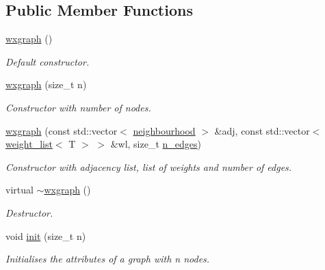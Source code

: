 \subsection*{Public Member Functions}
\begin{DoxyCompactItemize}
\item 
\mbox{\label{classlgraph_1_1wxgraph_ac5cda7ed506eeede338eddf6ef51e4bd}} 
\hyperlink{classlgraph_1_1wxgraph_ac5cda7ed506eeede338eddf6ef51e4bd}{wxgraph} ()
\begin{DoxyCompactList}\small\item\em Default constructor. \end{DoxyCompactList}\item 
\mbox{\label{classlgraph_1_1wxgraph_a84b632e0a65c1cba7e5e91afc576c91e}} 
\hyperlink{classlgraph_1_1wxgraph_a84b632e0a65c1cba7e5e91afc576c91e}{wxgraph} (size\+\_\+t n)
\begin{DoxyCompactList}\small\item\em Constructor with number of nodes. \end{DoxyCompactList}\item 
\hyperlink{classlgraph_1_1wxgraph_a6b99dfb7f13c6a8f223b74fecd0ea4a5}{wxgraph} (const std\+::vector$<$ \hyperlink{namespacelgraph_a052e7766c13f3a43cec0aec8173fdede}{neighbourhood} $>$ \&adj, const std\+::vector$<$ \hyperlink{namespacelgraph_a1e0fd5ef0a78b2a92da48adbed265cb6}{weight\+\_\+list}$<$ T $>$ $>$ \&wl, size\+\_\+t \hyperlink{classlgraph_1_1xxgraph_af00bce8b07a42754601d1e3bebe2c1fa}{n\+\_\+edges})
\begin{DoxyCompactList}\small\item\em Constructor with adjacency list, list of weights and number of edges. \end{DoxyCompactList}\item 
\mbox{\label{classlgraph_1_1wxgraph_ab36035f4ca3a467ad239457eea053128}} 
virtual \hyperlink{classlgraph_1_1wxgraph_ab36035f4ca3a467ad239457eea053128}{$\sim$wxgraph} ()
\begin{DoxyCompactList}\small\item\em Destructor. \end{DoxyCompactList}\item 
void \hyperlink{classlgraph_1_1wxgraph_aa09f37bf4a34a0f4f002587203df0125}{init} (size\+\_\+t n)
\begin{DoxyCompactList}\small\item\em Initialises the attributes of a graph with {\itshape n} nodes. \end{DoxyCompactList}\item 

\end{DoxyCompactItemize}
